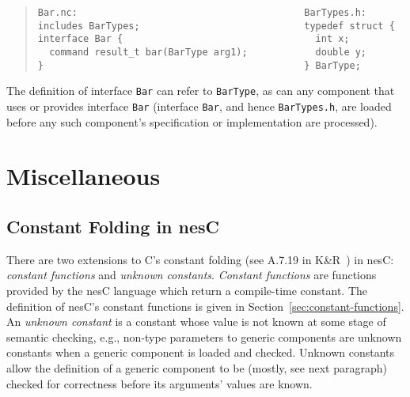 \documentclass[11pt,letterpaper]{article}
\newcommand{\code}[1]{{\tt #1}}
\newcommand{\file}[1]{{\tt #1}}
\newcommand{\nesc}{nesC\xspace}
\begin{document}
\begin{quote} \begin{verbatim}
Bar.nc:                                        BarTypes.h:      
includes BarTypes;                             typedef struct { 
interface Bar {                                  int x;         
  command result_t bar(BarType arg1);            double y;      
}                                              } BarType;
\end{verbatim} \end{quote}

The definition of interface \code{Bar} can refer to \code{BarType}, as can
any component that uses or provides interface \code{Bar} (interface
\code{Bar}, and hence \file{BarTypes.h}, are loaded before any such
component's specification or implementation are processed).

\section{Miscellaneous}
\label{sec:misc}

\subsection{Constant Folding in \nesc}
\label{sec:constant-folding}

There are two extensions to C's constant folding (see A.7.19 in
K\&R~\cite{kandr}) in \nesc: \emph{constant functions} and \emph{unknown
constants}. \emph{Constant functions} are functions provided by the \nesc
language which return a compile-time constant. The definition of \nesc's
constant functions is given in Section~\ref{sec:constant-functions}. An
\emph{unknown constant} is a constant whose value is not known at some
stage of semantic checking, e.g., non-type parameters to generic components
are unknown constants when a generic component is loaded and
checked. Unknown constants allow the definition of a generic component to
be (mostly, see next paragraph) checked for correctness before its
arguments' values are known.
\end{document}
